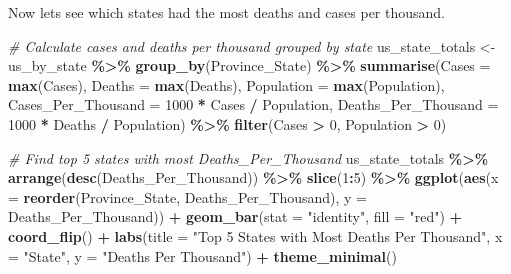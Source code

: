 \documentclass[
]{article}
\newenvironment{Shaded}{\begin{snugshade}}{\end{snugshade}}
\newcommand{\AttributeTok}[1]{\textcolor[rgb]{0.13,0.29,0.53}{#1}}
\newcommand{\CommentTok}[1]{\textcolor[rgb]{0.56,0.35,0.01}{\textit{#1}}}
\newcommand{\DecValTok}[1]{\textcolor[rgb]{0.00,0.00,0.81}{#1}}
\newcommand{\FunctionTok}[1]{\textcolor[rgb]{0.13,0.29,0.53}{\textbf{#1}}}
\newcommand{\NormalTok}[1]{#1}
\newcommand{\OtherTok}[1]{\textcolor[rgb]{0.56,0.35,0.01}{#1}}
\newcommand{\SpecialCharTok}[1]{\textcolor[rgb]{0.81,0.36,0.00}{\textbf{#1}}}
\newcommand{\StringTok}[1]{\textcolor[rgb]{0.31,0.60,0.02}{#1}}
\begin{document}
Now lets see which states had the most deaths and cases per thousand.

\begin{Shaded}
\begin{Highlighting}[]
\CommentTok{\# Calculate cases and deaths per thousand grouped by state}
\NormalTok{us\_state\_totals }\OtherTok{\textless{}{-}}\NormalTok{ us\_by\_state }\SpecialCharTok{\%\textgreater{}\%}
  \FunctionTok{group\_by}\NormalTok{(Province\_State) }\SpecialCharTok{\%\textgreater{}\%}
  \FunctionTok{summarise}\NormalTok{(}\AttributeTok{Cases =} \FunctionTok{max}\NormalTok{(Cases), }\AttributeTok{Deaths =} \FunctionTok{max}\NormalTok{(Deaths), }
            \AttributeTok{Population =} \FunctionTok{max}\NormalTok{(Population),}
            \AttributeTok{Cases\_Per\_Thousand =} \DecValTok{1000} \SpecialCharTok{*}\NormalTok{ Cases }\SpecialCharTok{/}\NormalTok{ Population,}
            \AttributeTok{Deaths\_Per\_Thousand =} \DecValTok{1000} \SpecialCharTok{*}\NormalTok{ Deaths }\SpecialCharTok{/}\NormalTok{ Population) }\SpecialCharTok{\%\textgreater{}\%}
  \FunctionTok{filter}\NormalTok{(Cases }\SpecialCharTok{\textgreater{}} \DecValTok{0}\NormalTok{, Population }\SpecialCharTok{\textgreater{}} \DecValTok{0}\NormalTok{)}

\CommentTok{\# Find top 5 states with most Deaths\_Per\_Thousand}
\NormalTok{us\_state\_totals }\SpecialCharTok{\%\textgreater{}\%}
  \FunctionTok{arrange}\NormalTok{(}\FunctionTok{desc}\NormalTok{(Deaths\_Per\_Thousand)) }\SpecialCharTok{\%\textgreater{}\%}
  \FunctionTok{slice}\NormalTok{(}\DecValTok{1}\SpecialCharTok{:}\DecValTok{5}\NormalTok{) }\SpecialCharTok{\%\textgreater{}\%}
  \FunctionTok{ggplot}\NormalTok{(}\FunctionTok{aes}\NormalTok{(}\AttributeTok{x =} \FunctionTok{reorder}\NormalTok{(Province\_State, Deaths\_Per\_Thousand), }\AttributeTok{y =}\NormalTok{ Deaths\_Per\_Thousand)) }\SpecialCharTok{+}
  \FunctionTok{geom\_bar}\NormalTok{(}\AttributeTok{stat =} \StringTok{"identity"}\NormalTok{, }\AttributeTok{fill =} \StringTok{"red"}\NormalTok{) }\SpecialCharTok{+}
  \FunctionTok{coord\_flip}\NormalTok{() }\SpecialCharTok{+}
  \FunctionTok{labs}\NormalTok{(}\AttributeTok{title =} \StringTok{"Top 5 States with Most Deaths Per Thousand"}\NormalTok{,}
       \AttributeTok{x =} \StringTok{"State"}\NormalTok{,}
       \AttributeTok{y =} \StringTok{"Deaths Per Thousand"}\NormalTok{) }\SpecialCharTok{+}
  \FunctionTok{theme\_minimal}\NormalTok{()}
\end{Highlighting}
\end{Shaded}
\end{document}
